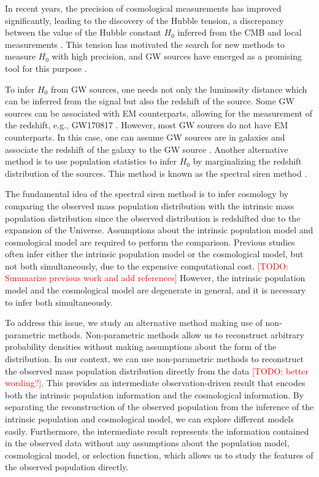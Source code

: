 \documentclass[twocolumn]{aastex631}
\newcommand{\todo}[1]{\textcolor{red}{[TODO: #1]}}
\begin{document}
In recent years, the precision of cosmological measurements has improved significantly, leading to the discovery of the Hubble tension, a discrepancy between the value of the Hubble constant $H_0$ inferred from the \ac{CMB} \citep{Planck:2018vyg} and local measurements \citep{Riess:2021jrx}.
This tension has motivated the search for new methods to measure $H_0$ with high precision, and \ac{GW} sources have emerged as a promising tool for this purpose \citep{LIGOScientific:2017adf, LIGOScientific:2021aug, Ezquiaga:2022zkx}.

To infer $H_0$ from \ac{GW} sources, one needs not only the luminosity distance which can be inferred from the signal but also the redshift of the source.
Some \ac{GW} sources can be associated with \ac{EM} counterparts, allowing for the measurement of the redshift, e.g., GW170817 \citep{LIGOScientific:2017adf, Guidorzi:2017ogy}.
However, most \ac{GW} sources do not have \ac{EM} counterparts.
In this case, one can assume \ac{GW} sources are in galaxies and associate the redshift of the galaxy to the \ac{GW} source \citep{Schutz:1986gp, DelPozzo:2011vcw, Gray:2019ksv, Gray:2023wgj}.
Another alternative method is to use population statistics to infer $H_0$ by marginalizing the redshift distribution of the sources.
This method is known as the spectral siren method \citep{You:2020wju, Mastrogiovanni:2021wsd, LIGOScientific:2021aug, Ezquiaga:2022zkx}.

The fundamental idea of the spectral siren method is to infer cosmology by comparing the observed mass population distribution with the intrinsic mass population distribution since the observed distribution is redshifted due to the expansion of the Universe.
Assumptions about the intrinsic population model and cosmological model are required to perform the comparison.
Previous studies often infer either the intrinsic population model or the cosmological model, but not both simultaneously, due to the expensive computational cost.
\todo{Summarize previous work and add references}
However, the intrinsic population model and the cosmological model are degenerate in general, and it is necessary to infer both simultaneously.

To address this issue, we study an alternative method making use of non-parametric methods.
Non-parametric methods allow us to reconstruct arbitrary probability densities without making assumptions about the form of the distribution.
In our context, we can use non-parametric methods to reconstruct the observed mass population distribution directly from the data \todo{better wording?}.
This provides an intermediate observation-driven result that encodes both the intrinsic population information and the cosmological information.
By separating the reconstruction of the observed population from the inference of the intrinsic population and cosmological model, we can explore different models easily.
Furthermore, the intermediate result represents the information contained in the observed data without any assumptions about the population model, cosmological model, or selection function, which allows us to study the features of the observed population directly.
\end{document}
